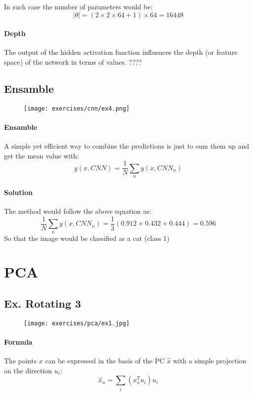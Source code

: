 In such case the number of parameters would be:
$$|\theta|=(2\times 2\times 64 +1)\times 64=16448$$


\paragraph{Depth}
The output of the hidden activation function influences the depth (or feature space) of the network in terms of values. ????

\subsection{Ensamble}
\begin{figure}[H]
    \centering
    \texttt{[image: exercises/cnn/ex4.png]}
\end{figure}

\paragraph{Ensamble}
A simple yet efficient way to combine the predictions is just to sum them up and get the mean value with:
$$y(x,CNN)=\frac{1}{N}\sum_n y(x,CNN_n)$$

\paragraph{Solution}
The method would follow the above equation as:
$$\frac{1}{N}\sum_n y(x,CNN_n)=\frac{1}{3}(0.912+0.432+0.444)=0.596$$
So that the image would be classified as a cat (class 1)


\section{PCA}

\subsection{Ex. Rotating 3}

\begin{figure}[H]
    \centering
    \texttt{[image: exercises/pca/ex1.jpg]}
\end{figure}

\paragraph{Formula}
The points  $x$ can be expressed in the basis of the PC $\hat{x}$ with a simple projection on the direction $u_i$:
$$\hat{x}_n=\sum_i(x^T_nu_i)u_i$$

